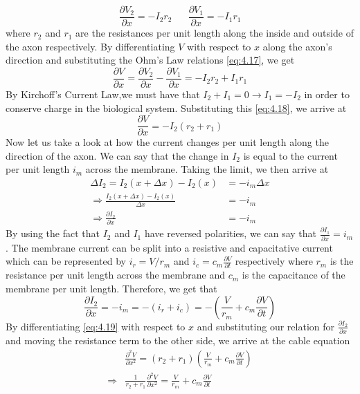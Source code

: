 \documentclass{article}
\newcommand{\pd}[2]{\frac{\partial #1}{\partial #2}}
\newcommand{\pdt}[2]{\frac{\partial ^2 #1}{\partial #2 ^2}}
\numberwithin{equation}{section}
\begin{document}
\begin{equation}
    \pd{V_2}{x} = -I_2r_2 \hspace{20pt} \pd{V_1}{x} = -I_1r_1 \label{eq:4.17}
\end{equation}
where $r_2$ and $r_1$ are the resistances per unit length along the inside and outside of the axon respectively. By differentiating $V$ with respect to $x$ along the axon's direction and substituting the Ohm's Law relations \eqref{eq:4.17}, we get 
\begin{equation}
    \pd{V}{x} = \pd{V_2}{x} - \pd{V_1}{x} = -I_2r_2+I_1r_1 \label{eq:4.18}
\end{equation}
By Kirchoff's Current Law,we must have that $I_2+I_1=0 \rightarrow I_1=-I_2$ in order to conserve charge in the biological system. Substituting this \eqref{eq:4.18}, we arrive at 
\begin{equation}
    \pd{V}{x} = -I_2 (r_2+r_1) \label{eq:4.19}
\end{equation}
Now let us take a look at how the current changes per unit length along the direction of the axon. We can say that the change in $I_2$ is equal to the current per unit length $i_m$ across the membrane. Taking the limit, we then arrive at  
\begin{equation*}
\begin{split}
    \Delta I_2 = I_2(x+\Delta x) - I_2(x) &=-i_m \Delta x \\
    \Rightarrow \frac{I_2(x+\Delta x) - I_2(x)}{\Delta x} &=-i_m\\
    \Rightarrow \pd{I_2}{x} &=-i_m
\end{split}
\end{equation*}
By using the fact that $I_2$ and $I_1$ have reversed polarities, we can say that $\pd{I_1}{x} =i_m$. The membrane current can be split into a resistive and capacitative current which can be represented by $i_r = V/r_m$ and $i_c = c_m\pd{V}{t}$ respectively where $r_m$ is the resistance per unit length across the membrane and $c_m$ is the capacitance of the membrane per unit length. Therefore, we get that 
\begin{equation}
    \pd{I_2}{x} = -i_m = -(i_r+i_c) = - \left(\frac{V}{r_m} +c_m\pd{V}{t} \right)
\end{equation}
By differentiating \eqref{eq:4.19} with respect to $x$ and substituting our relation for $\pd{I_2}{x}$ and moving the resistance term to the other side, we arrive at the cable equation
\begin{equation}
\begin{split}
    &\pdt{V}{x} =(r_2+r_1) \left( \frac{V}{r_m} + c_m \pd{V}{t} \right) \\
    \Rightarrow&\frac{1}{r_2+r_1} \pdt{V}{x} = \frac{V}{r_m} +c_m \pd{V}{t}
\end{split}
\end{equation}
\end{document}
